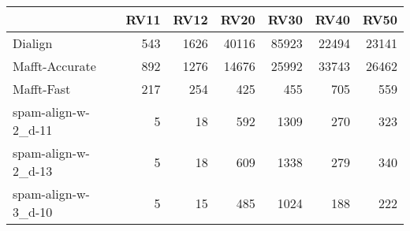 \begin{tabular}{lrrrrrr}
\toprule
{} &  RV11 &  RV12 &   RV20 &   RV30 &   RV40 &   RV50 \\
\midrule
Dialign             &   543 &  1626 &  40116 &  85923 &  22494 &  23141 \\
Mafft-Accurate      &   892 &  1276 &  14676 &  25992 &  33743 &  26462 \\
Mafft-Fast          &   217 &   254 &    425 &    455 &    705 &    559 \\
spam-align-w-2\_d-11 &     5 &    18 &    592 &   1309 &    270 &    323 \\
spam-align-w-2\_d-13 &     5 &    18 &    609 &   1338 &    279 &    340 \\
spam-align-w-3\_d-10 &     5 &    15 &    485 &   1024 &    188 &    222 \\
\bottomrule
\end{tabular}
